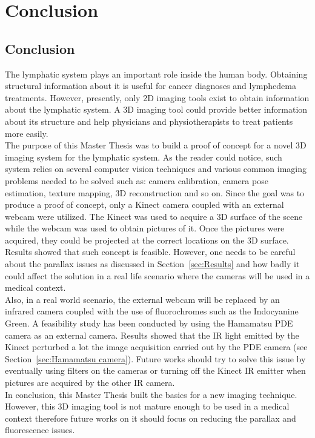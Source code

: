 \chapter[Conclusion]{Conclusion}
\section{Conclusion}
The lymphatic system plays an important role inside the human body. Obtaining structural information about it is useful for cancer diagnoses and lymphedema treatments. However, presently, only 2D imaging tools exist to obtain information about the lymphatic system. A 3D imaging tool could provide better information about its structure and help physicians and physiotherapists to treat patients more easily.\\

The purpose of this Master Thesis was to build a proof of concept for a novel 3D imaging system for the lymphatic system. As the reader could notice, such system relies on several computer vision techniques and various common imaging problems needed to be solved such as: camera calibration, camera pose estimation, texture mapping, 3D reconstruction and so on. Since the goal was to produce a proof of concept, only a Kinect camera coupled with an external webcam were utilized. The Kinect was used to acquire a 3D surface of the scene while the webcam was used to obtain pictures of it. Once the pictures were acquired, they could be projected at the correct locations on the 3D surface. Results showed that such concept is feasible. However, one needs to be careful about the parallax issues as discussed in Section~\ref{sec:Results} and how badly it could affect the solution in a real life scenario where the cameras will be used in a medical context.\\ 

Also, in a real world scenario, the external webcam will be replaced by an infrared camera coupled with the use of fluorochromes such as the Indocyanine Green. A feasibility study has been conducted by using the Hamamatsu PDE camera as an external camera. Results showed that the IR light emitted by the Kinect perturbed a lot the image acquisition carried out by the PDE camera (see Section~\ref{sec:Hamamatsu camera}). Future works should try to solve this issue by eventually using filters on the cameras or turning off the Kinect IR emitter when pictures are acquired by the other IR camera.\\

In conclusion, this Master Thesis built the basics for a new imaging technique. However, this 3D imaging tool is not mature enough to be used in a medical context therefore future works on it should focus on reducing the parallax and fluorescence issues.  